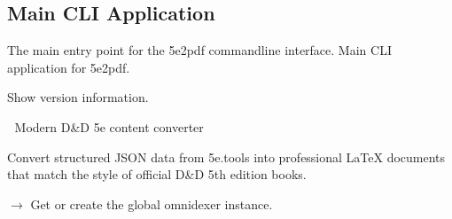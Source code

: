 \documentclass[letterpaper,10pt,english]{sphinxmanual}
\begin{document}
\subsection{Main CLI Application}
\label{\detokenize{api/cli:main-cli-application}}
\sphinxAtStartPar
The main entry point for the 5e2pdf command\sphinxhyphen{}line interface.
\label{\detokenize{api/cli:module-src.cli.main}}
\sphinxAtStartPar
Main CLI application for 5e2pdf.

\begin{fulllineitems}
\label{\detokenize{api/cli:src.cli.main.show_version}}
\pysigstartsignatures
\pysiglinewithargsret
{}
{}
{}
\pysigstopsignatures
\sphinxAtStartPar
Show version information.

\end{fulllineitems}


\begin{fulllineitems}
\label{\detokenize{api/cli:src.cli.main.main}}
\pysigstartsignatures
\pysiglinewithargsret
{}
{}
{}
\pysigstopsignatures
\sphinxAtStartPar
🎲  \sphinxhyphen{} Modern D\&D 5e content converter

\sphinxAtStartPar
Convert structured JSON data from 5e.tools into professional LaTeX documents
that match the style of official D\&D 5th edition books.

\end{fulllineitems}


\begin{fulllineitems}
\label{\detokenize{api/cli:src.cli.main.get_omnidexer}}
\pysigstartsignatures
\pysiglinewithargsret
{}
{}
{{ $\rightarrow$ {\hyperref[\detokenize{api/core:src.core.loaders.omnidexer.Omnidexer}]{}}}}
\pysigstopsignatures
\sphinxAtStartPar
Get or create the global omnidexer instance.

\end{fulllineitems}
\end{document}
